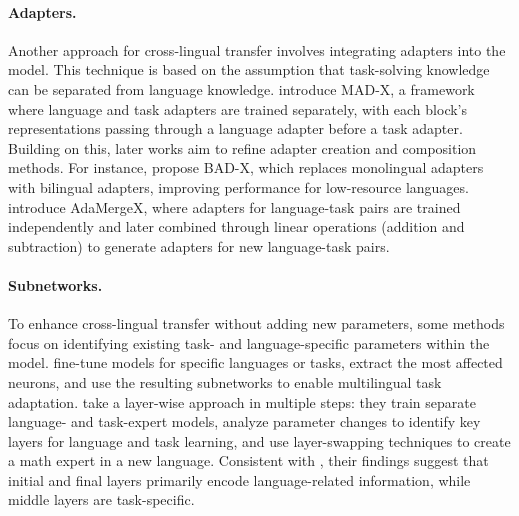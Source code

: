 \paragraph{Adapters.}

Another approach for cross-lingual transfer involves integrating adapters into the model. This technique is based on the assumption that task-solving knowledge can be separated from language knowledge. \citet{pfeiffer-etal-2020-mad} introduce MAD-X, a framework where language and task adapters are trained separately, with each block’s representations passing through a language adapter before a task adapter. Building on this, later works aim to refine adapter creation and composition methods. For instance, \citet{parovic-etal-2022-bad} propose BAD-X, which replaces monolingual adapters with bilingual adapters, improving performance for low-resource languages. \citet{zhao2024adamergex} introduce AdaMergeX, where adapters for language-task pairs are trained independently and later combined through linear operations (addition and subtraction) to generate adapters for new language-task pairs.    



\paragraph{Subnetworks.}

To enhance cross-lingual transfer without adding new parameters, some methods focus on identifying existing task- and language-specific parameters within the model. \citet{choenni-etal-2023-cross} fine-tune models for specific languages or tasks, extract the most affected neurons, and use the resulting subnetworks to enable multilingual task adaptation. \citet{bandarkar2024layer} take a layer-wise approach in multiple steps: they train separate language- and task-expert models, analyze parameter changes to identify key layers for language and task learning, and use layer-swapping techniques to create a math expert in a new language. Consistent with \citet{zhao2024large}, their findings suggest that initial and final layers primarily encode language-related information, while middle layers are task-specific.